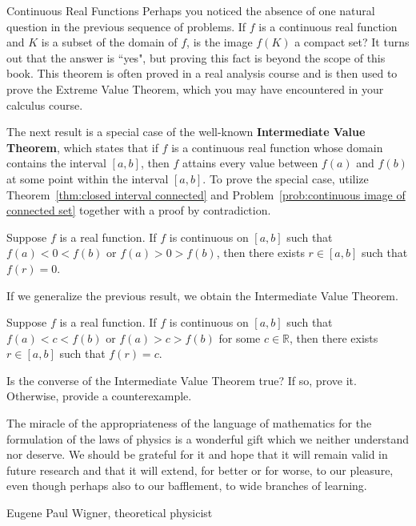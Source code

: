 \begin{section}{Continuous Real Functions}
Perhaps you noticed the absence of one natural question in the previous sequence of problems. If $f$ is a continuous real function and $K$ is a subset of the domain of $f$, is the image $f(K)$ a compact set?  It turns out that the answer is ``yes", but proving this fact is beyond the scope of this book. This theorem is often proved in a real analysis course and is then used to prove the Extreme Value Theorem, which you may have encountered in your calculus course.

The next result is a special case of the well-known \textbf{Intermediate Value Theorem}, which states that if $f$ is a continuous real function whose domain contains the interval $[a,b]$, then $f$ attains every value between $f(a)$ and $f(b)$ at some point within the interval $[a,b]$. To prove the special case, utilize Theorem~\ref{thm:closed interval connected} and Problem~\ref{prob:continuous image of connected set} together with a proof by contradiction.

\begin{theorem}
Suppose $f$ is a real function. If $f$ is continuous on $[a,b]$ such that $f(a)<0<f(b)$ or $f(a)>0>f(b)$, then there exists $r\in [a,b]$ such that $f(r)=0$.
\end{theorem}

If we generalize the previous result, we obtain the Intermediate Value Theorem.

\begin{theorem}
Suppose $f$ is a real function. If $f$ is continuous on $[a,b]$ such that $f(a)<c<f(b)$ or $f(a)>c>f(b)$ for some $c\in \mathbb{R}$, then there exists $r\in [a,b]$ such that $f(r)=c$.
\end{theorem}

\begin{problem}
Is the converse of the Intermediate Value Theorem true? If so, prove it.  Otherwise, provide a counterexample.
\end{problem}

\epigraph{The miracle of the appropriateness of the language of mathematics for the formulation of the laws of physics is a wonderful gift which we neither understand nor deserve. We should be grateful for it and hope that it will remain valid in future research and that it will extend, for better or for worse, to our pleasure, even though perhaps also to our bafflement, to wide branches of learning.}{Eugene Paul Wigner, theoretical physicist}

\end{section}